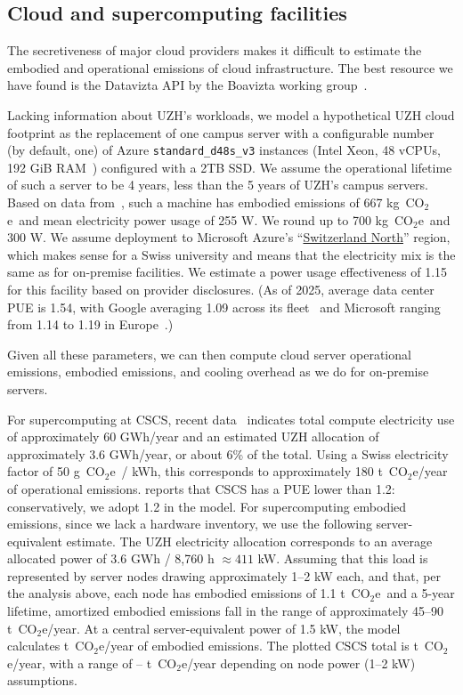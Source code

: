 \documentclass[11pt]{article}
\let\cite\parencite
\newcommand{\coe}{CO$_2$e}
\newcommand{\gcoe}{g~\coe}
\newcommand{\tcoe}{t~\coe}
\newcommand{\kgcoe}{k\gcoe}
\newcommand{\gcoekwh}{\gcoe\ / kWh}
\begin{document}
\subsection{Cloud and supercomputing facilities}

The secretiveness of major cloud providers makes it difficult to estimate the
embodied and operational emissions of cloud infrastructure. The best resource we
have found is the Datavizta API by the Boavizta working
group~\cite{boavizta:api}.

Lacking information about UZH's workloads, we model a hypothetical UZH cloud
footprint as the replacement of one campus server with a configurable number (by
default, one) of Azure {\tt standard\_d48s\_v3} instances (Intel Xeon, 48 vCPUs,
192 GiB RAM~\cite{msftvms}) configured with a 2TB SSD. We assume the operational
lifetime of such a server to be 4 years, less than the 5 years of UZH's campus
servers. Based on data from~\textcite{boavizta:api}, such a machine has embodied
emissions of 667 \kgcoe\ and mean electricity power usage of 255 W. We round up
to 700 \kgcoe\ and 300 W. We assume deployment to Microsoft Azure's
``\href{https://datacenters.microsoft.com/globe/explore?info=region_switzerlandnorth}{Switzerland
North}'' region, which makes sense for a Swiss university and means that the
electricity mix is the same as for on-premise facilities. We estimate a power
usage effectiveness of 1.15 for this facility based on provider disclosures. (As
of 2025, average data center PUE is 1.54, with Google averaging 1.09 across its
fleet~\cite{google:datacenter:efficiency} and Microsoft ranging from 1.14 to
1.19 in Europe~\cite{microsoft:datacenter:efficiency}.)

Given all these parameters, we can then compute cloud server operational
emissions, embodied emissions, and cooling overhead as we do for on-premise
servers.

For supercomputing at CSCS, recent data~\cite{cscs:supercomputing} indicates
total compute electricity use of approximately 60 GWh/year and an estimated UZH
allocation of approximately 3.6 GWh/year, or about 6\% of the total. Using a
Swiss electricity factor of 50 \gcoekwh, this corresponds to approximately 180
\tcoe/year of operational emissions. \textcite{cscs:efficiency} reports that
CSCS has a PUE lower than 1.2: conservatively, we adopt 1.2 in the model. For
supercomputing embodied emissions, since we lack a hardware inventory, we use
the following server-equivalent estimate. The UZH electricity allocation
corresponds to an average allocated power of $3.6$ GWh / 8,760 h $\approx 411$
kW. Assuming that this load is represented by server nodes drawing approximately
1--2 kW each, and that, per the analysis above, each node has embodied
emissions of 1.1 \tcoe\ and a 5-year lifetime, amortized embodied emissions fall
in the range of approximately 45--90 \tcoe/year. At a central server-equivalent
power of 1.5 kW, the model calculates \ModelCscsHardwareT{} \tcoe/year of
embodied emissions. The plotted CSCS total is \ModelCscsTotalT{} \tcoe/year,
with a range of \ModelCscsLowT{}--\ModelCscsHighT{} \tcoe/year depending on node
power (1--2 kW) assumptions.
\end{document}
